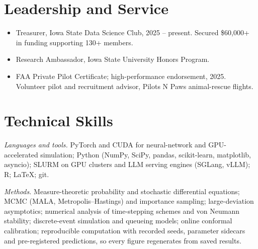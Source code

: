 \documentclass[11pt]{article}
\begin{document}
\section{Leadership and Service}

\begin{itemize}
  \item Treasurer, Iowa State Data Science Club, 2025 -- present. Secured \$60{,}000+
    in funding supporting 130+ members.
  \item Research Ambassador, Iowa State University Honors Program.
  \item FAA Private Pilot Certificate; high-performance endorsement, 2025. Volunteer
    pilot and recruitment advisor, Pilots N Paws animal-rescue flights.
\end{itemize}

\section{Technical Skills}

\noindent\textit{Languages and tools.} PyTorch and CUDA for neural-network and
GPU-accelerated simulation; Python (NumPy, SciPy, pandas, scikit-learn, matplotlib,
asyncio); SLURM on GPU clusters and LLM serving engines (SGLang, vLLM); R; \LaTeX; git.\par
\vspace{0.3em}
\noindent\textit{Methods.} Measure-theoretic probability and stochastic differential
equations; MCMC (MALA, Metropolis--Hastings) and importance sampling; large-deviation
asymptotics; numerical analysis of time-stepping schemes and von Neumann stability;
discrete-event simulation and queueing models; online conformal calibration;
reproducible computation with recorded seeds, parameter sidecars and pre-registered
predictions, so every figure regenerates from saved results.
\end{document}
